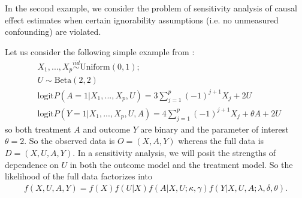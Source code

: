 \documentclass[11pt]{article}
\begin{document}
\begin{example}
\label{eg:sensitivity}

In the second example, we consider the problem of sensitivity analysis of causal effect estimates when certain ignorability assumptions (i.e. no unmeasured confounding) are violated.

Let us consider the following simple example from \cite{zhang2019semiparametric}:
\begin{equation}
\label{model-sens}
\begin{split}
& X_{1},..., X_{p} \mathop{\sim}\limits^{iid} \text{Uniform} (0, 1);  \\
& U \sim \text{Beta} (2, 2) \\
& \text{logit} P\left( A = 1 | X_{1}, ... , X_{p}, U \right) = 3\sum_{j=1}^{p}(-1)^{j+1}X_{j} + 2 U \\
& \text{logit} P\left( Y = 1 | X_{1}, ... ,X_{p}, U, A \right) = 4\sum_{j=1}^{p}(-1)^{j+1}X_{j} + \theta A + 2 U
\end{split}
\end{equation}
so both treatment $A$ and outcome $Y$ are binary and the parameter of interest $\theta = 2$. So the observed data is $O = (X, A, Y)$ whereas the full data is $D = (X, U, A, Y)$. In a sensitivity analysis, we will posit the strengths of dependence on $U$ in both the outcome model and the treatment model. So the likelihood of the full data factorizes into
\begin{align*}
f (X, U, A, Y) = f (X) f (U | X) f (A | X, U; \kappa, \gamma) f (Y | X, U, A; \lambda, \delta, \theta).
\end{align*}


\end{example}
\end{document}
